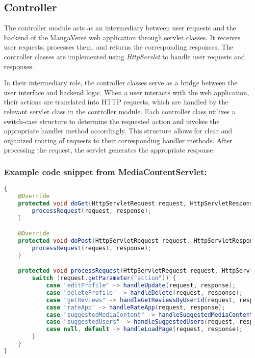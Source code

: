 \subsection*{Controller}

The controller module acts as an intermediary between user requests and the backend of the MangaVerse web application 
through servlet classes. It receives user requests, processes them, and returns the corresponding responses. 
The controller classes are implemented using \textit{HttpServlet} to handle user requests and responses.

\vspace{\baselineskip}

In their intermediary role, the controller classes serve as a bridge between the user interface and backend logic. 
When a user interacts with the web application, their actions are translated into HTTP requests, which are handled 
by the relevant servlet class in the controller module. Each controller class utilizes a switch-case structure to 
determine the requested action and invokes the appropriate handler method accordingly. This structure allows for 
clear and organized routing of requests to their corresponding handler methods. After processing the request, the 
servlet generates the appropriate response.

\vspace{\baselineskip}

\subsubsection*{Example code snippet from MediaContentServlet:}
\begin{mdframed}[style=customstyle]
    \begin{lstlisting}[language=java]
{
    @Override
    protected void doGet(HttpServletRequest request, HttpServletResponse response) throws IOException, ServletException {
        processRequest(request, response);
    }

    @Override
    protected void doPost(HttpServletRequest request, HttpServletResponse response) throws IOException, ServletException {
        processRequest(request, response);
    }

    protected void processRequest(HttpServletRequest request, HttpServletResponse response) throws IOException, ServletException {
        switch (request.getParameter("action")) {
            case "editProfile" -> handleUpdate(request, response);
            case "deleteProfile" -> handleDelete(request, response);
            case "getReviews" -> handleGetReviewsByUserId(request, response);
            case "rateApp" -> handleRateApp(request, response);
            case "suggestedMediaContent" -> handleSuggestedMediaContent(request, response);
            case "suggestedUsers" -> handleSuggestedUsers(request, response);
            case null, default -> handleLoadPage(request, response);
        }
    }
}\end{lstlisting}
\end{mdframed}

